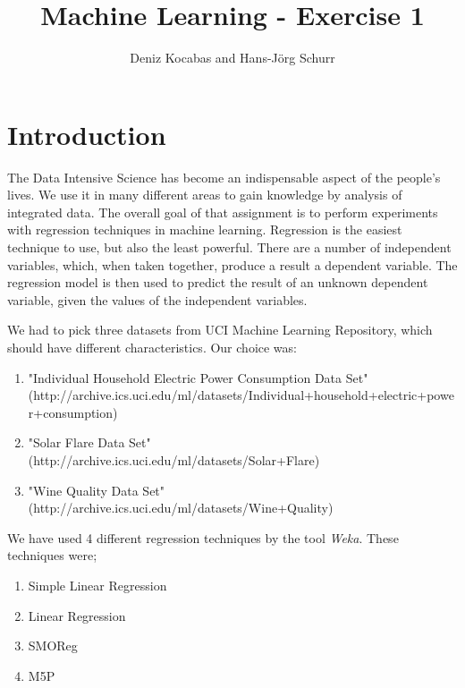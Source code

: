 \documentclass[a4paper]{article}
\begin{document}
\title{Machine Learning - Exercise 1 }
\author{Deniz Kocabas and Hans-Jörg Schurr}

\maketitle
\tableofcontents
\newpage

\section{Introduction}
The Data Intensive Science has become an indispensable aspect of the people's lives. We use it in many different areas to gain knowledge by analysis of integrated data. The overall goal of that assignment is to perform experiments with regression techniques in machine learning. Regression is the easiest technique to use, but also the least powerful. There are a number of independent variables, which, when taken together, produce a result a dependent variable. The regression model is then used to predict the result of an unknown dependent variable, given the values of the independent variables. 

We had to pick three datasets from UCI Machine Learning Repository, which should have different characteristics. 
Our choice was:
\begin{enumerate}
    \item "Individual Household Electric Power Consumption Data Set" \\ (http://archive.ics.uci.edu/ml/datasets/Individual+household+electric+power+consumption)
    \item "Solar Flare Data Set" \\
        (http://archive.ics.uci.edu/ml/datasets/Solar+Flare)
    \item "Wine Quality Data Set" \\
        (http://archive.ics.uci.edu/ml/datasets/Wine+Quality)
\end{enumerate}

We have used 4 different regression techniques by the tool \emph{Weka}. 
These techniques were;
\begin{enumerate}
    \item Simple Linear Regression
    \item Linear Regression
    \item SMOReg
    \item M5P
\end{enumerate}
\end{document}
